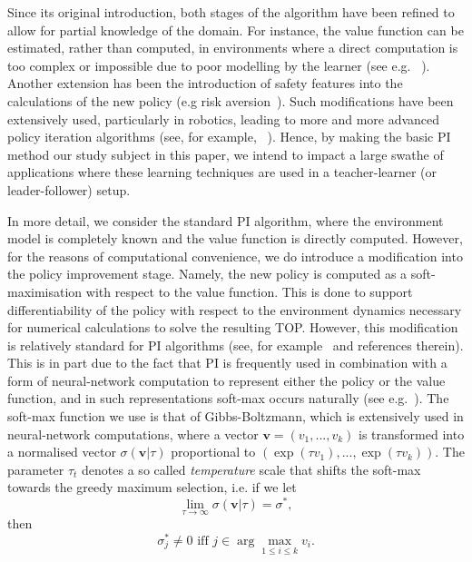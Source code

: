 Since its original introduction, both stages of the algorithm have
been refined to allow for partial knowledge of the domain.  For
instance, the value function can be estimated, rather than computed,
in environments where a direct computation is too complex or
impossible due to poor modelling by the learner (see
e.g. ~\cite{vanRoy_98,koller_parr_2000,lagoudakis_parr_2003}). Another
extension has been the introduction of safety features into the
calculations of the new policy (e.g risk
aversion~\cite{howard_metheson_72,marcus_et_al_97,sato_kobayashi_2000}). Such
modifications have been extensively used, particularly in robotics,
leading to more and more advanced policy iteration algorithms (see,
for example, ~\cite{sugiyama_et_al_2009,lagoudakis_parr_2003}). Hence,
by making the basic PI method our study subject in this paper, we
intend to impact a large swathe of applications where these learning
techniques are used in a teacher-learner (or leader-follower) setup.

In more detail, we consider the standard PI algorithm, where the
environment model is completely known and the value function is
directly computed. However, for the reasons of computational
convenience, we do introduce a modification into the policy
improvement stage. Namely, the new policy is computed as a
soft-maximisation with respect to the value function. This is done to
support differentiability of the policy with respect to the
environment dynamics necessary for numerical calculations to solve the
resulting TOP. However, this modification is relatively standard for
PI algorithms (see, for example~\cite{perkins_precup_2003} and
references therein). This is in part due to the fact that PI is
frequently used in combination with a form of neural-network
computation to represent either the policy or the value function, and
in such representations soft-max occurs naturally (see
e.g.~\cite{bertsekas_tsitsiklis_book_96}). The soft-max function we
use is that of Gibbs-Boltzmann, which is extensively used in
neural-network computations, where a vector $\mathbf{v}=(v_1,...,v_k)$
is transformed into a normalised vector $\sigma(\mathbf{v}|\tau)$
proportional to $(\exp(\tau v_1),...,\exp(\tau v_k))$. The parameter
$\tau_t$ denotes a so called {\em temperature} scale that shifts the
soft-max towards the greedy maximum selection, i.e. if we let
\[
\lim\limits_{\tau\rightarrow\infty}\sigma(\mathbf{v}|\tau)=\sigma^*,
\]
then 
\[\sigma^*_j\neq 0 \mbox{ iff } j\in\arg\max\limits_{1\leq i\leq k}v_i.\]


